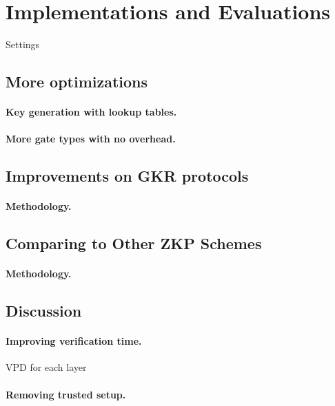 \section{Implementations and Evaluations}\label{sec:eval}



Settings

\subsection{More optimizations}
\paragraph{Key generation with lookup tables.}

\paragraph{More gate types with no overhead.}

\subsection{Improvements on GKR protocols}\label{subsec:expGKR}
\paragraph{Methodology.}


\subsection{Comparing to Other ZKP Schemes}\label{subsec:expZKP}

\paragraph{Methodology.}


\subsection{Discussion}

\paragraph{Improving verification time.}

VPD for each layer

\paragraph{Removing trusted setup.}